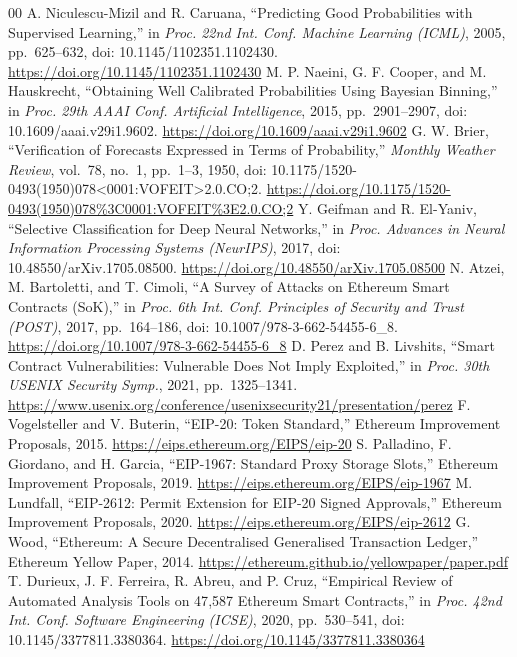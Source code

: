 \documentclass[conference]{IEEEtran}
\begin{document}
\begin{thebibliography}{00}
 A. Niculescu-Mizil and R. Caruana, ``Predicting Good Probabilities with Supervised Learning,'' in \textit{Proc. 22nd Int. Conf. Machine Learning (ICML)}, 2005, pp.\ 625--632, doi: 10.1145/1102351.1102430. \url{https://doi.org/10.1145/1102351.1102430}
 M. P. Naeini, G. F. Cooper, and M. Hauskrecht, ``Obtaining Well Calibrated Probabilities Using Bayesian Binning,'' in \textit{Proc. 29th AAAI Conf. Artificial Intelligence}, 2015, pp.\ 2901--2907, doi: 10.1609/aaai.v29i1.9602. \url{https://doi.org/10.1609/aaai.v29i1.9602}
 G. W. Brier, ``Verification of Forecasts Expressed in Terms of Probability,'' \textit{Monthly Weather Review}, vol.\ 78, no.\ 1, pp.\ 1--3, 1950, doi: 10.1175/1520-0493(1950)078<0001:VOFEIT>2.0.CO;2. \url{https://doi.org/10.1175/1520-0493(1950)078\%3C0001:VOFEIT\%3E2.0.CO;2}
 Y. Geifman and R. El-Yaniv, ``Selective Classification for Deep Neural Networks,'' in \textit{Proc. Advances in Neural Information Processing Systems (NeurIPS)}, 2017, doi: 10.48550/arXiv.1705.08500. \url{https://doi.org/10.48550/arXiv.1705.08500}
 N. Atzei, M. Bartoletti, and T. Cimoli, ``A Survey of Attacks on Ethereum Smart Contracts (SoK),'' in \textit{Proc. 6th Int. Conf. Principles of Security and Trust (POST)}, 2017, pp.\ 164--186, doi: 10.1007/978-3-662-54455-6\_8. \url{https://doi.org/10.1007/978-3-662-54455-6_8}
 D. Perez and B. Livshits, ``Smart Contract Vulnerabilities: Vulnerable Does Not Imply Exploited,'' in \textit{Proc. 30th USENIX Security Symp.}, 2021, pp.\ 1325--1341. \url{https://www.usenix.org/conference/usenixsecurity21/presentation/perez}
 F. Vogelsteller and V. Buterin, ``EIP-20: Token Standard,'' Ethereum Improvement Proposals, 2015. \url{https://eips.ethereum.org/EIPS/eip-20}
 S. Palladino, F. Giordano, and H. Garcia, ``EIP-1967: Standard Proxy Storage Slots,'' Ethereum Improvement Proposals, 2019. \url{https://eips.ethereum.org/EIPS/eip-1967}
 M. Lundfall, ``EIP-2612: Permit Extension for EIP-20 Signed Approvals,'' Ethereum Improvement Proposals, 2020. \url{https://eips.ethereum.org/EIPS/eip-2612}
 G. Wood, ``Ethereum: A Secure Decentralised Generalised Transaction Ledger,'' Ethereum Yellow Paper, 2014. \url{https://ethereum.github.io/yellowpaper/paper.pdf}
 T. Durieux, J. F. Ferreira, R. Abreu, and P. Cruz, ``Empirical Review of Automated Analysis Tools on 47{,}587 Ethereum Smart Contracts,'' in \textit{Proc. 42nd Int. Conf. Software Engineering (ICSE)}, 2020, pp.\ 530--541, doi: 10.1145/3377811.3380364. \url{https://doi.org/10.1145/3377811.3380364}
\end{thebibliography}
\end{document}
